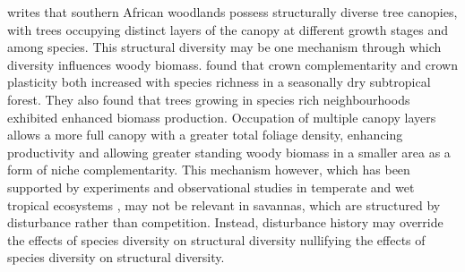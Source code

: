\documentclass[11pt,a4paper]{article}
\begin{document}


\citet{Solbrig1996} writes that southern African woodlands possess structurally diverse tree canopies, with trees occupying distinct layers of the canopy at different growth stages and among species. This structural diversity may be one mechanism through which diversity influences woody biomass. \citep{Kunz2019} found that crown complementarity and crown plasticity both increased with species richness in a seasonally dry subtropical forest. They also found that trees growing in species rich neighbourhoods exhibited enhanced biomass production. Occupation of multiple canopy layers allows a more full canopy with a greater total foliage density, enhancing productivity and allowing greater standing woody biomass in a smaller area as a form of niche complementarity. This mechanism however, which has been supported by experiments and observational studies in temperate and wet tropical ecosystems \citep{Hardiman2011, Stark2012}, may not be relevant in savannas, which are structured by disturbance rather than competition. Instead, disturbance history may override the effects of species diversity on structural diversity nullifying the effects of species diversity on structural diversity.

\end{document}

